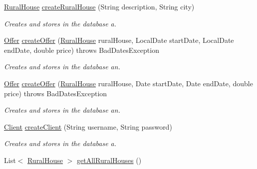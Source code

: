 \begin{DoxyCompactItemize}
\mbox{\hyperlink{classcom_1_1ruralhousejsf_1_1domain_1_1_rural_house}{Rural\+House}} \mbox{\hyperlink{classcom_1_1ruralhousejsf_1_1business_logic_1_1_application_facade_impl_a48b82f812a30271878f50b99ae16a24b}{create\+Rural\+House}} (String description, String city)
\begin{DoxyCompactList}\small\item\em Creates and stores in the database a. \end{DoxyCompactList}\item 
\mbox{\hyperlink{classcom_1_1ruralhousejsf_1_1domain_1_1_offer}{Offer}} \mbox{\hyperlink{classcom_1_1ruralhousejsf_1_1business_logic_1_1_application_facade_impl_acbf81cc6dc4bf9adf9ea7a85751edfc0}{create\+Offer}} (\mbox{\hyperlink{classcom_1_1ruralhousejsf_1_1domain_1_1_rural_house}{Rural\+House}} rural\+House, Local\+Date start\+Date, Local\+Date end\+Date, double price)  throws Bad\+Dates\+Exception 
\begin{DoxyCompactList}\small\item\em Creates and stores in the database an. \end{DoxyCompactList}\item 
\mbox{\hyperlink{classcom_1_1ruralhousejsf_1_1domain_1_1_offer}{Offer}} \mbox{\hyperlink{classcom_1_1ruralhousejsf_1_1business_logic_1_1_application_facade_impl_a9aafb2ac6e91d643bc5dd1f5691d4075}{create\+Offer}} (\mbox{\hyperlink{classcom_1_1ruralhousejsf_1_1domain_1_1_rural_house}{Rural\+House}} rural\+House, Date start\+Date, Date end\+Date, double price)  throws Bad\+Dates\+Exception 
\begin{DoxyCompactList}\small\item\em Creates and stores in the database an. \end{DoxyCompactList}\item 
\mbox{\hyperlink{classcom_1_1ruralhousejsf_1_1domain_1_1_client}{Client}} \mbox{\hyperlink{classcom_1_1ruralhousejsf_1_1business_logic_1_1_application_facade_impl_ae48e63f3df5226e46e4a57a64d120823}{create\+Client}} (String username, String password)
\begin{DoxyCompactList}\small\item\em Creates and stores in the database a. \end{DoxyCompactList}\item 
List$<$ \mbox{\hyperlink{classcom_1_1ruralhousejsf_1_1domain_1_1_rural_house}{Rural\+House}} $>$ \mbox{\hyperlink{classcom_1_1ruralhousejsf_1_1business_logic_1_1_application_facade_impl_a22bb7d4b98f51470315a81cd0d6f2290}{get\+All\+Rural\+Houses}} ()

\end{DoxyCompactItemize}

